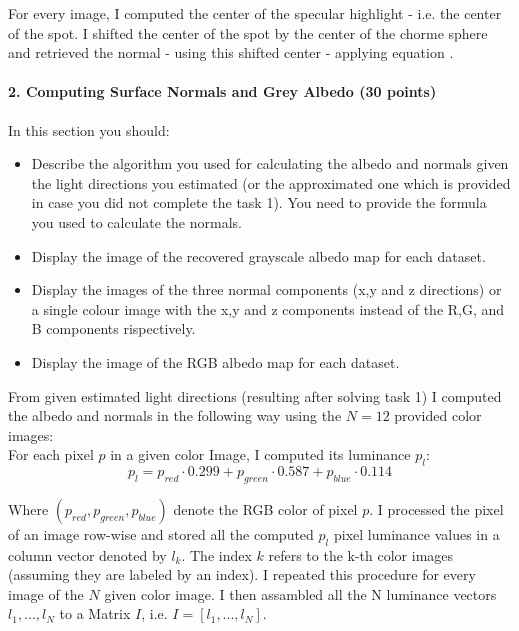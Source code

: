 \documentclass{paper}
\begin{document}
For every image, I computed the center of the specular highlight - i.e. the center of the spot. I shifted the center of the spot by the center of the chorme sphere and retrieved the normal - using this shifted center - applying equation $\label{eq:final_normal}$.


\paragraph{2. Computing Surface Normals and Grey Albedo (30 points)}

In this section you should:

\begin{itemize}
\item Describe the algorithm you used for calculating the albedo and normals given the light directions you estimated (or the approximated one which is provided in case you did not complete the task 1). You need to provide the formula you used to calculate the normals.

\item Display the image of the recovered grayscale albedo map for each dataset.
\item Display the images of the three normal components (x,y and z directions) or a single colour image with the x,y and z components instead of the R,G, and B components rispectively.
\item Display the image of the RGB albedo map for each dataset. 
\end{itemize}

From given estimated light directions (resulting after solving task 1) I computed the albedo and normals in the following way using the $N=12$ provided color images: \\

For each pixel $p$ in a given color Image, I computed its luminance $p_l$:
\begin{equation}
    p_l = p_{red}\cdot 0.299 + p_{green} \cdot 0.587 + p_{blue} \cdot 0.114 
\label{eq:liminance}
\end{equation}

Where $(p_{red}, p_{green}, p_{blue})$ denote the RGB color of pixel $p$. I processed the pixel of an image row-wise and stored all the computed $p_l$ pixel luminance values in a column vector denoted by $l_k$. The index $k$ refers to the k-th color images (assuming they are labeled by an index). I repeated this procedure for every image of the $N$ given color image. I then assambled all the N luminance vectors $l_1, ..., l_N$ to a Matrix $I$, i.e. $I = \left[l_1,...,l_N\right]$. 
\end{document}
